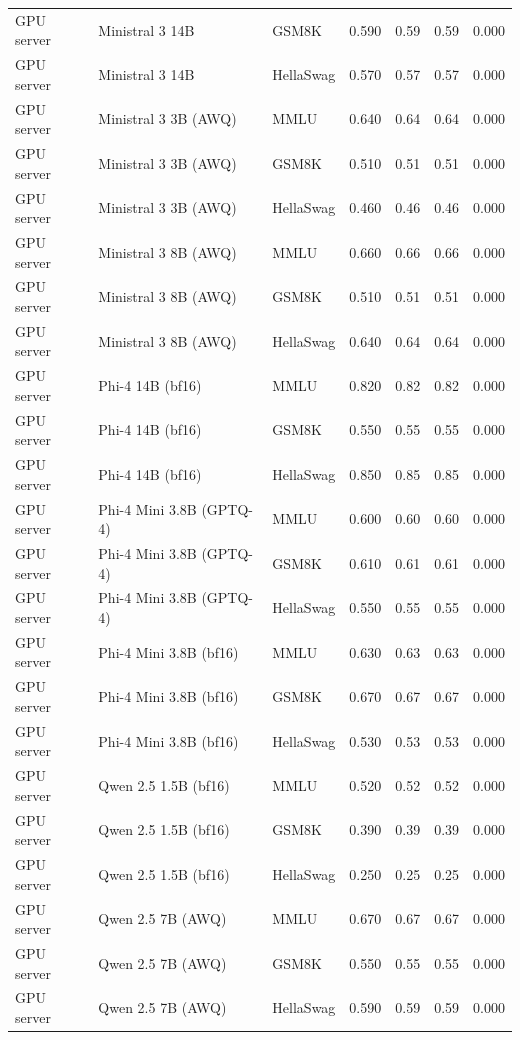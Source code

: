 \begin{longtable}{@{}l l l r r r r@{}}
GPU server & Ministral 3 14B & GSM8K & 0.590 & 0.59 & 0.59 & 0.000 \\
GPU server & Ministral 3 14B & HellaSwag & 0.570 & 0.57 & 0.57 & 0.000 \\
GPU server & Ministral 3 3B (AWQ) & MMLU & 0.640 & 0.64 & 0.64 & 0.000 \\
GPU server & Ministral 3 3B (AWQ) & GSM8K & 0.510 & 0.51 & 0.51 & 0.000 \\
GPU server & Ministral 3 3B (AWQ) & HellaSwag & 0.460 & 0.46 & 0.46 & 0.000 \\
GPU server & Ministral 3 8B (AWQ) & MMLU & 0.660 & 0.66 & 0.66 & 0.000 \\
GPU server & Ministral 3 8B (AWQ) & GSM8K & 0.510 & 0.51 & 0.51 & 0.000 \\
GPU server & Ministral 3 8B (AWQ) & HellaSwag & 0.640 & 0.64 & 0.64 & 0.000 \\
GPU server & Phi-4 14B (bf16) & MMLU & 0.820 & 0.82 & 0.82 & 0.000 \\
GPU server & Phi-4 14B (bf16) & GSM8K & 0.550 & 0.55 & 0.55 & 0.000 \\
GPU server & Phi-4 14B (bf16) & HellaSwag & 0.850 & 0.85 & 0.85 & 0.000 \\
GPU server & Phi-4 Mini 3.8B (GPTQ-4) & MMLU & 0.600 & 0.60 & 0.60 & 0.000 \\
GPU server & Phi-4 Mini 3.8B (GPTQ-4) & GSM8K & 0.610 & 0.61 & 0.61 & 0.000 \\
GPU server & Phi-4 Mini 3.8B (GPTQ-4) & HellaSwag & 0.550 & 0.55 & 0.55 & 0.000 \\
GPU server & Phi-4 Mini 3.8B (bf16) & MMLU & 0.630 & 0.63 & 0.63 & 0.000 \\
GPU server & Phi-4 Mini 3.8B (bf16) & GSM8K & 0.670 & 0.67 & 0.67 & 0.000 \\
GPU server & Phi-4 Mini 3.8B (bf16) & HellaSwag & 0.530 & 0.53 & 0.53 & 0.000 \\
GPU server & Qwen 2.5 1.5B (bf16) & MMLU & 0.520 & 0.52 & 0.52 & 0.000 \\
GPU server & Qwen 2.5 1.5B (bf16) & GSM8K & 0.390 & 0.39 & 0.39 & 0.000 \\
GPU server & Qwen 2.5 1.5B (bf16) & HellaSwag & 0.250 & 0.25 & 0.25 & 0.000 \\
GPU server & Qwen 2.5 7B (AWQ) & MMLU & 0.670 & 0.67 & 0.67 & 0.000 \\
GPU server & Qwen 2.5 7B (AWQ) & GSM8K & 0.550 & 0.55 & 0.55 & 0.000 \\
GPU server & Qwen 2.5 7B (AWQ) & HellaSwag & 0.590 & 0.59 & 0.59 & 0.000 \\

\end{longtable}
